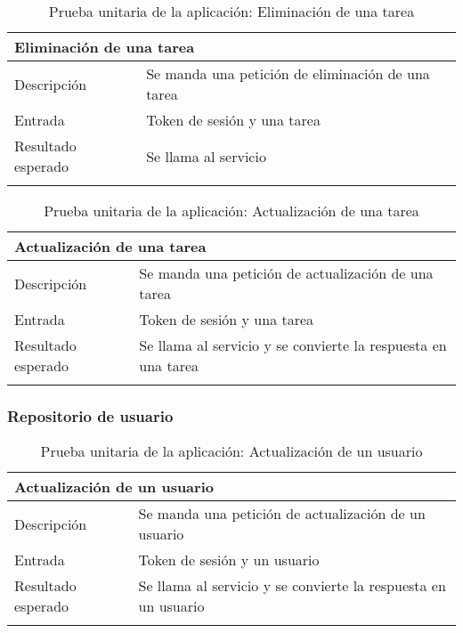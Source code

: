 \begin{longtable}{|p{} p{}|}
    \hline
    \multicolumn{2}{|l|}{\textbf{Eliminación de una tarea}} \\ \hline 
    Descripción                 & Se manda una petición de eliminación de una tarea \\ \hline
    Entrada                     & Token de sesión y una tarea \\ \hline
    Resultado esperado          & Se llama al servicio \\ \hline
    \caption{Prueba unitaria de la aplicación: Eliminación de una tarea}
    \label{cp:u:app:eliminacion_tarea_repo}
\end{longtable}

\begin{longtable}{|p{} p{}|}
    \hline
    \multicolumn{2}{|l|}{\textbf{Actualización de una tarea}} \\ \hline 
    Descripción                 & Se manda una petición de actualización de una tarea \\ \hline
    Entrada                     & Token de sesión y una tarea \\ \hline
    Resultado esperado          & Se llama al servicio y se convierte la respuesta en una tarea \\ \hline
    \caption{Prueba unitaria de la aplicación: Actualización de una tarea}
    \label{cp:u:app:actualizacion_tarea_repo}
\end{longtable}

\subsubsection{Repositorio de usuario}

\begin{longtable}{|p{} p{}|}
    \hline
    \multicolumn{2}{|l|}{\textbf{Actualización de un usuario}} \\ \hline 
    Descripción                 & Se manda una petición de actualización de un usuario \\ \hline
    Entrada                     & Token de sesión y un usuario \\ \hline
    Resultado esperado          & Se llama al servicio y se convierte la respuesta en un usuario \\ \hline
    \caption{Prueba unitaria de la aplicación: Actualización de un usuario}
    \label{cp:u:app:actualizacion_usuario_repo}
\end{longtable}

